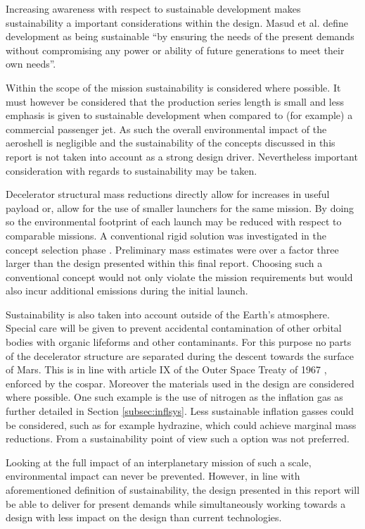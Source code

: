 Increasing awareness with respect to sustainable development makes sustainability a important considerations within the design. Masud et al. define development as being sustainable  ``by ensuring the needs of the present demands without compromising any power or ability of future generations to meet their own needs''\cite[p.85]{Masud2011}. 

Within the scope of the mission sustainability is considered where possible. It must however be considered that the production series length is small and less emphasis is given to sustainable development when compared to (for example) a commercial passenger jet. As such the overall environmental impact of the aeroshell is negligible and the sustainability of the concepts discussed in this report is not taken into account as a strong design driver. Nevertheless important consideration with regards to sustainability may be taken. 

Decelerator structural mass reductions directly allow for increases in useful payload or, allow for the use of smaller launchers for the same mission. By doing so the environmental footprint of each launch may be reduced with respect to comparable missions. A conventional rigid solution was investigated in the concept selection phase \cite{Balasooriyan2015b}. Preliminary mass estimates were over a factor three larger than the design presented within this final report. Choosing such a conventional concept would not only violate the mission requirements but would also incur additional emissions during the initial launch.

Sustainability is also taken into account outside of the Earth's atmosphere. Special care will be given to prevent accidental contamination of other orbital bodies with organic lifeforms and other contaminants. For this purpose no parts of the decelerator structure are separated during the descent towards the surface of Mars. This is in line with article IX of the Outer Space Treaty of 1967 \cite{UnitedNations2008}, enforced by the \gls{cospar}. Moreover the materials used in the design are considered where possible. One such example is the use of nitrogen as the inflation gas as further detailed in Section \ref{subsec:inflsys}. Less sustainable inflation gasses could be considered, such as for example hydrazine, which could achieve marginal mass reductions. From a sustainability point of view such a option was not preferred.

Looking at the full impact of an interplanetary mission of such a scale, environmental impact can never be prevented. However, in line with aforementioned definition of sustainability, the design presented in this report will be able to deliver for present demands while simultaneously working towards a design with less impact on the design than current technologies.

